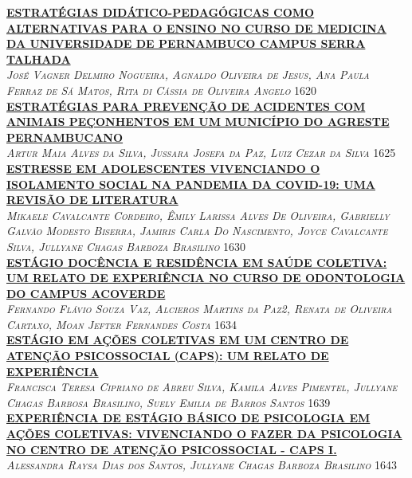 \noindent \textsc{\hyperlink{trabalhos/250554.pdf.1}{\textbf{ESTRATÉGIAS DIDÁTICO-PEDAGÓGICAS COMO ALTERNATIVAS PARA O ENSINO NO CURSO DE MEDICINA DA UNIVERSIDADE DE PERNAMBUCO CAMPUS SERRA TALHADA}}}\\ 
\noindent \textsc{\textit{José Vagner Delmiro Nogueira, Agnaldo Oliveira de Jesus, Ana Paula Ferraz de Sá Matos, Rita di Cássia de Oliveira Angelo}} \hfill 1620\\ 

\noindent \textsc{\hyperlink{trabalhos/251824.pdf.1}{\textbf{ESTRATÉGIAS PARA PREVENÇÃO DE ACIDENTES COM ANIMAIS PEÇONHENTOS EM UM MUNICÍPIO DO AGRESTE PERNAMBUCANO }}}\\ 
\noindent \textsc{\textit{Artur Maia Alves da Silva, Jussara Josefa da Paz, Luiz Cezar da Silva}} \hfill 1625\\ 

\noindent \textsc{\hyperlink{trabalhos/251764.pdf.1}{\textbf{ESTRESSE EM ADOLESCENTES VIVENCIANDO O ISOLAMENTO SOCIAL NA PANDEMIA DA COVID-19: UMA REVISÃO DE LITERATURA }}}\\ 
\noindent \textsc{\textit{Mikaele Cavalcante Cordeiro, Êmily Larissa Alves De Oliveira, Gabrielly Galvão Modesto Biserra, Jamiris Carla Do Nascimento, Joyce Cavalcante Silva, Jullyane Chagas Barboza Brasilino}} \hfill 1630\\ 

\noindent \textsc{\hyperlink{trabalhos/251787.pdf.1}{\textbf{ESTÁGIO DOCÊNCIA E RESIDÊNCIA EM SAÚDE COLETIVA: UM RELATO DE EXPERIÊNCIA NO CURSO DE ODONTOLOGIA DO CAMPUS ACOVERDE}}}\\ 
\noindent \textsc{\textit{Fernando Flávio Souza Vaz, Alcieros Martins da Paz2, Renata de Oliveira Cartaxo, Moan Jefter Fernandes Costa}} \hfill 1634\\ 

\noindent \textsc{\hyperlink{trabalhos/251628.pdf.1}{\textbf{ESTÁGIO EM AÇÕES COLETIVAS EM UM CENTRO DE ATENÇÃO PSICOSSOCIAL (CAPS): UM RELATO DE EXPERIÊNCIA }}}\\ 
\noindent \textsc{\textit{Francisca Teresa Cipriano de Abreu Silva, Kamila Alves Pimentel, Jullyane Chagas Barbosa Brasilino, Suely Emilia de Barros Santos}} \hfill 1639\\ 

\noindent \textsc{\hyperlink{trabalhos/249393.pdf.1}{\textbf{EXPERIÊNCIA DE ESTÁGIO BÁSICO DE PSICOLOGIA EM AÇÕES COLETIVAS: VIVENCIANDO O FAZER DA PSICOLOGIA NO CENTRO DE ATENÇÃO PSICOSSOCIAL - CAPS I.}}}\\ 
\noindent \textsc{\textit{Alessandra Raysa Dias dos Santos, Jullyane Chagas Barboza Brasilino}} \hfill 1643\\ 


